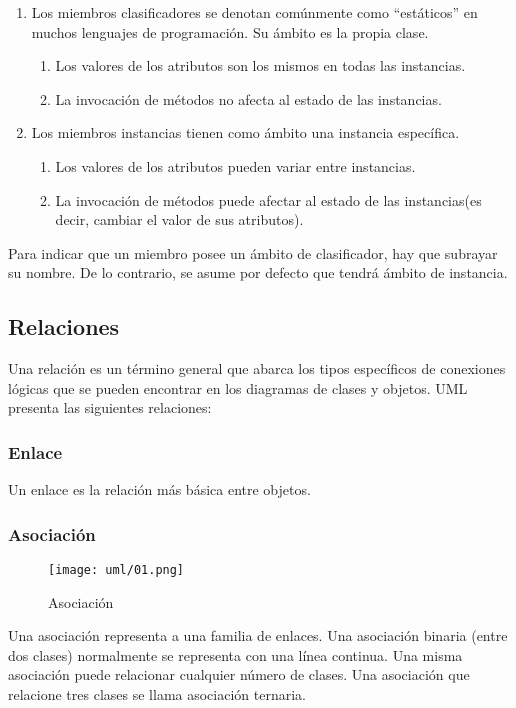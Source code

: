 \begin{enumerate}
    \item Los miembros clasificadores se denotan comúnmente como “estáticos” en muchos lenguajes de programación. Su ámbito es la propia clase.
    \begin{enumerate}
        \item Los valores de los atributos son los mismos en todas las instancias.
        \item La invocación de métodos no afecta al estado de las instancias.
    \end{enumerate}
    \item Los miembros instancias tienen como ámbito una instancia específica.
\begin{enumerate}
    \item Los valores de los atributos pueden variar entre instancias.
    \item La invocación de métodos puede afectar al estado de las instancias(es decir, cambiar el valor de sus atributos).
\end{enumerate}
\end{enumerate}
Para indicar que un miembro posee un ámbito de clasificador, hay que subrayar su nombre. De lo contrario, se asume por defecto que tendrá ámbito de instancia.

\subsection*{Relaciones}
Una relación es un término general que abarca los tipos específicos de conexiones lógicas que se pueden encontrar en los diagramas de clases y objetos. UML presenta las siguientes relaciones:

\subsubsection*{Enlace}
Un enlace es la relación más básica entre objetos.

\subsubsection*{Asociación}

\begin{figure}[h!t] 
    \centering
    \texttt{[image: uml/01.png]}
    \caption{Asociación}
    \label{img:uml-asociacion}
\end{figure}

Una asociación representa a una familia de enlaces. Una asociación binaria (entre dos clases) normalmente se representa con una línea continua. Una misma asociación puede relacionar cualquier número de clases. Una asociación que relacione tres clases se llama asociación ternaria.

